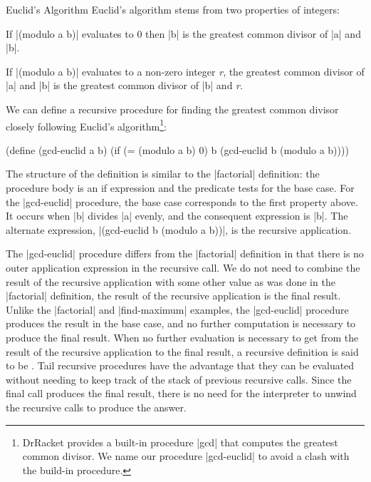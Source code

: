 \begin{schemeregion}
\begin{examplenobar}{Euclid's Algorithm\label{ex:gcd}}
Euclid's algorithm stems from two properties of integers:
\begin{enumtight}
\item If \scheme|(modulo a b)| evaluates to 0 then \scheme|b| is the greatest common divisor of \scheme|a| and \scheme|b|.  
\item If \scheme|(modulo a b)| evaluates to a non-zero integer \emph{r}, the greatest common divisor of \scheme|a| and \scheme|b| is the greatest common divisor of \scheme|b| and \emph{r}.
\end{enumtight}
We can define a recursive procedure for finding the greatest common divisor closely following Euclid's algorithm\footnote{DrRacket provides a built-in procedure \scheme|gcd| that computes the greatest common divisor.  We name our procedure \scheme|gcd-euclid| to avoid a clash with the build-in procedure.}:
\begin{schemedisplay}
(define (gcd-euclid a b) 
  (if (= (modulo a b) 0) b (gcd-euclid b (modulo a b))))
\end{schemedisplay}
The structure of the definition is similar to the \scheme|factorial| definition: the procedure body is an if expression and the predicate tests for the base case.  For the \scheme|gcd-euclid| procedure, the base case corresponds to the first property above.  It occurs when \scheme|b| divides \scheme|a| evenly, and the consequent expression is \scheme|b|.  The alternate expression, \scheme|(gcd-euclid b (modulo a b))|, is the recursive application.  

The \scheme|gcd-euclid| procedure differs from the \scheme|factorial| definition in that there is no outer application expression in the recursive call.  We do not need to combine the result of the recursive application with some other value as was done in the \scheme|factorial| definition, the result of the recursive application is the final result.  Unlike the \scheme|factorial| and \scheme|find-maximum| examples, the \scheme|gcd-euclid| procedure produces the result in the base case, and no further computation is necessary to produce the final result.  When no further evaluation is necessary to get from the result of the recursive application to the final result, a recursive definition is said to be .  Tail recursive procedures have the advantage that they can be evaluated without needing to keep track of the stack of previous recursive calls.  Since the final call produces the final result, there is no need for the interpreter to unwind the recursive calls to produce the answer. 


\end{examplenobar}
\end{schemeregion}
